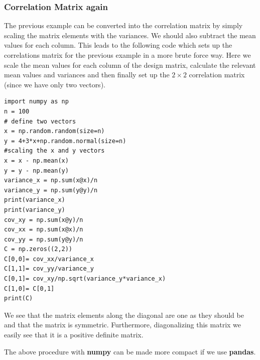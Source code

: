 \documentclass{beamer}
\begin{document}
\begin{frame}
\frametitle{Correlation Matrix again}

The previous example can be converted into the correlation matrix by
simply scaling the matrix elements with the variances.  We should also
subtract the mean values for each column. This leads to the following
code which sets up the correlations matrix for the previous example in
a more brute force way. Here we scale the mean values for each column of the design matrix, calculate the relevant mean values and variances and then finally set up the $2\times 2$ correlation matrix (since we have only two vectors). 























\begin{verbatim}
import numpy as np
n = 100
# define two vectors                                                                                           
x = np.random.random(size=n)
y = 4+3*x+np.random.normal(size=n)
#scaling the x and y vectors                                                                                   
x = x - np.mean(x)
y = y - np.mean(y)
variance_x = np.sum(x@x)/n
variance_y = np.sum(y@y)/n
print(variance_x)
print(variance_y)
cov_xy = np.sum(x@y)/n
cov_xx = np.sum(x@x)/n
cov_yy = np.sum(y@y)/n
C = np.zeros((2,2))
C[0,0]= cov_xx/variance_x
C[1,1]= cov_yy/variance_y
C[0,1]= cov_xy/np.sqrt(variance_y*variance_x)
C[1,0]= C[0,1]
print(C)

\end{verbatim}


We see that the matrix elements along the diagonal are one as they
should be and that the matrix is symmetric. Furthermore, diagonalizing
this matrix we easily see that it is a positive definite matrix.

The above procedure with \textbf{numpy} can be made more compact if we use \textbf{pandas}.
\end{frame}
\end{document}
